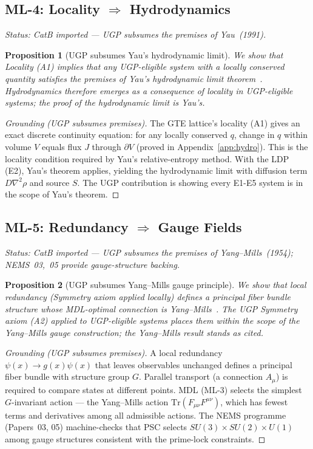 \documentclass[11pt]{article}
\newtheorem{proposition}{Proposition}[section]
\begin{document}
\subsection{ML-4: Locality $\Rightarrow$ Hydrodynamics}
\emph{Status: CatB imported — UGP subsumes the premises of Yau~(1991).}

\begin{proposition}[UGP subsumes Yau's hydrodynamic limit]
We show that Locality (A1) implies that any UGP-eligible system with a locally conserved quantity satisfies the premises of Yau's hydrodynamic limit theorem~\cite{Yau1991}. Hydrodynamics therefore emerges as a consequence of locality in UGP-eligible systems; the proof of the hydrodynamic limit is Yau's.
\end{proposition}
\begin{proof}[Grounding (UGP subsumes premises)]
The GTE lattice's locality (A1) gives an exact discrete continuity equation: for any locally conserved $q$, change in $q$ within volume $V$ equals flux $J$ through $\partial V$ (proved in Appendix~\ref{app:hydro}). This is the locality condition required by Yau's relative-entropy method. With the LDP (E2), Yau's theorem applies, yielding the hydrodynamic limit with diffusion term $D\nabla^2\rho$ and source $S$. The UGP contribution is showing every E1-E5 system is in the scope of Yau's theorem.
\end{proof}

\subsection{ML-5: Redundancy $\Rightarrow$ Gauge Fields}
\emph{Status: CatB imported — UGP subsumes the premises of Yang--Mills~(1954); NEMS~03,~05 provide gauge-structure backing.}

\begin{proposition}[UGP subsumes Yang--Mills gauge principle]
We show that local redundancy (Symmetry axiom applied locally) defines a principal fiber bundle structure whose MDL-optimal connection is Yang--Mills~\cite{YangMills1954}. The UGP Symmetry axiom (A2) applied to UGP-eligible systems places them within the scope of the Yang--Mills gauge construction; the Yang--Mills result stands as cited.
\end{proposition}
\begin{proof}[Grounding (UGP subsumes premises)]
A local redundancy $\psi(x)\to g(x)\psi(x)$ that leaves observables unchanged defines a principal fiber bundle with structure group $G$. Parallel transport (a connection $A_\mu$) is required to compare states at different points. MDL (ML-3) selects the simplest $G$-invariant action — the Yang--Mills action $\mathrm{Tr}(F_{\mu\nu}F^{\mu\nu})$, which has fewest terms and derivatives among all admissible actions. The NEMS programme (Papers~03, 05) machine-checks that PSC selects $SU(3)\times SU(2)\times U(1)$ among gauge structures consistent with the prime-lock constraints.
\end{proof}
\end{document}
